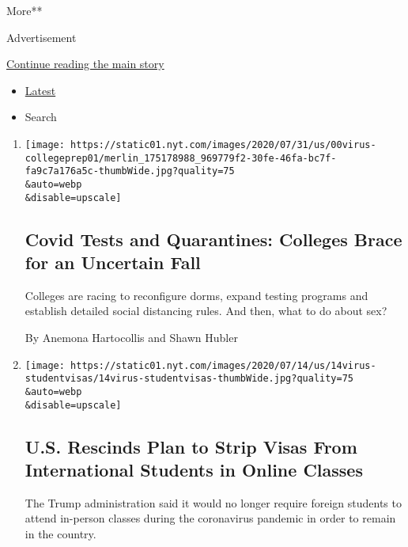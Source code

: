 More**

Advertisement

\protect\hyperlink{after-mid1}{Continue reading the main story}

\begin{itemize}
\tightlist
\item
  \protect\hyperlink{stream-panel}{Latest}
\item
  Search
\end{itemize}

\begin{enumerate}
\def\labelenumi{\arabic{enumi}.}
\item
  \href{/2020/08/02/us/covid-college-reopening.html}{}

  \texttt{[image: https://static01.nyt.com/images/2020/07/31/us/00virus-collegeprep01/merlin\_175178988\_969779f2-30fe-46fa-bc7f-fa9c7a176a5c-thumbWide.jpg?quality=75\\\&auto=webp\\\&disable=upscale]}

  \hypertarget{covid-tests-and-quarantines-colleges-brace-for-an-uncertain-fall}{%
  \subsection{Covid Tests and Quarantines: Colleges Brace for an
  Uncertain
  Fall}\label{covid-tests-and-quarantines-colleges-brace-for-an-uncertain-fall}}

  Colleges are racing to reconfigure dorms, expand testing programs and
  establish detailed social distancing rules. And then, what to do about
  sex?

  By Anemona Hartocollis and Shawn Hubler
\item
  \href{/2020/07/14/us/coronavirus-international-foreign-student-visas.html}{}

  \texttt{[image: https://static01.nyt.com/images/2020/07/14/us/14virus-studentvisas/14virus-studentvisas-thumbWide.jpg?quality=75\\\&auto=webp\\\&disable=upscale]}

  \hypertarget{us-rescinds-plan-to-strip-visas-from-international-students-in-online-classes}{%
  \subsection{U.S. Rescinds Plan to Strip Visas From International
  Students in Online
  Classes}\label{us-rescinds-plan-to-strip-visas-from-international-students-in-online-classes}}

  The Trump administration said it would no longer require foreign
  students to attend in-person classes during the coronavirus pandemic
  in order to remain in the country.


\end{enumerate}
